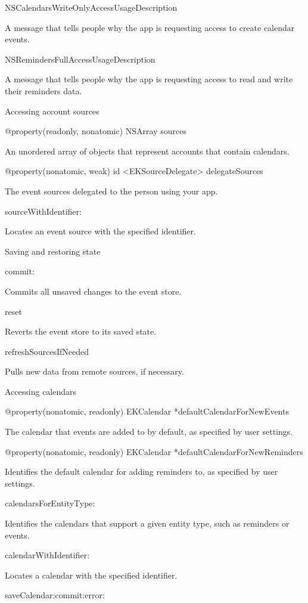 \documentclass{article}
\begin{document}
NSCalendarsWriteOnlyAccessUsageDescription

A message that tells people why the app is requesting access to create calendar events.

NSRemindersFullAccessUsageDescription

A message that tells people why the app is requesting access to read and write their reminders data.

Accessing account sources

@property(readonly, nonatomic) NSArray \*sources

An unordered array of objects that represent accounts that contain calendars.

@property(nonatomic, weak) id <EKSourceDelegate> delegateSources

The event sources delegated to the person using your app.

\textminus sourceWithIdentifier:

Locates an event source with the specified identifier.

Saving and restoring state

\textminus commit:

Commits all unsaved changes to the event store.

\textminus reset

Reverts the event store to its saved state.

\textminus refreshSourcesIfNeeded

Pulls new data from remote sources, if necessary.

Accessing calendars

@property(nonatomic, readonly) EKCalendar *defaultCalendarForNewEvents

The calendar that events are added to by default, as specified by user settings.

@property(nonatomic, readonly) EKCalendar *defaultCalendarForNewReminders

Identifies the default calendar for adding reminders to, as specified by user settings.

\textminus calendarsForEntityType:

Identifies the calendars that support a given entity type, such as reminders or events.

\textminus calendarWithIdentifier:

Locates a calendar with the specified identifier.

\textminus saveCalendar:commit:error:
\end{document}
